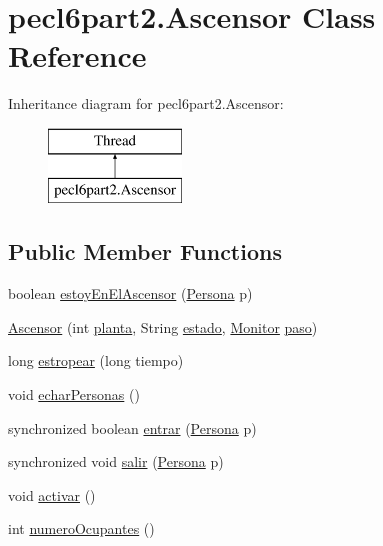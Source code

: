 \hypertarget{classpecl6part2_1_1_ascensor}{}\section{pecl6part2.\+Ascensor Class Reference}
\label{classpecl6part2_1_1_ascensor}
Inheritance diagram for pecl6part2.\+Ascensor\+:\begin{figure}[H]
\begin{center}
\leavevmode
\includegraphics[height=2.000000cm]{classpecl6part2_1_1_ascensor}
\end{center}
\end{figure}
\subsection*{Public Member Functions}
\begin{DoxyCompactItemize}
\item 
boolean \mbox{\hyperlink{classpecl6part2_1_1_ascensor_a0ec994e509b6cddd706e1f6ee613d6f8}{estoy\+En\+El\+Ascensor}} (\mbox{\hyperlink{classpecl6part2_1_1_persona}{Persona}} p)
\item 
\mbox{\hyperlink{classpecl6part2_1_1_ascensor_a4d9a2b5177e6f4d52b05b3de925c22ba}{Ascensor}} (int \mbox{\hyperlink{classpecl6part2_1_1_ascensor_a66017643cc6554b17d447867a0c0d619}{planta}}, String \mbox{\hyperlink{classpecl6part2_1_1_ascensor_a6a578a2c1bc59586257fe412a44354ac}{estado}}, \mbox{\hyperlink{classpecl6part2_1_1_monitor}{Monitor}} \mbox{\hyperlink{classpecl6part2_1_1_ascensor_adc56f3cc0cc6adaf409f5aeb4283808f}{paso}})
\item 
long \mbox{\hyperlink{classpecl6part2_1_1_ascensor_ab558a9179249070810128b1355edb385}{estropear}} (long tiempo)
\item 
void \mbox{\hyperlink{classpecl6part2_1_1_ascensor_afe4d81d992e11113248e2637e523c28d}{echar\+Personas}} ()
\item 
synchronized boolean \mbox{\hyperlink{classpecl6part2_1_1_ascensor_a39f39c41b77b0f31601a0afd10e38930}{entrar}} (\mbox{\hyperlink{classpecl6part2_1_1_persona}{Persona}} p)
\item 
synchronized void \mbox{\hyperlink{classpecl6part2_1_1_ascensor_af74cb9df5027dc401dd20dbca538f7d6}{salir}} (\mbox{\hyperlink{classpecl6part2_1_1_persona}{Persona}} p)
\item 
void \mbox{\hyperlink{classpecl6part2_1_1_ascensor_a50d2b8eb03373f9df861ef78266ac641}{activar}} ()
\item 
int \mbox{\hyperlink{classpecl6part2_1_1_ascensor_af45fe15f097cdb4d74fb0bce843ccac6}{numero\+Ocupantes}} ()
\end{DoxyCompactItemize}
